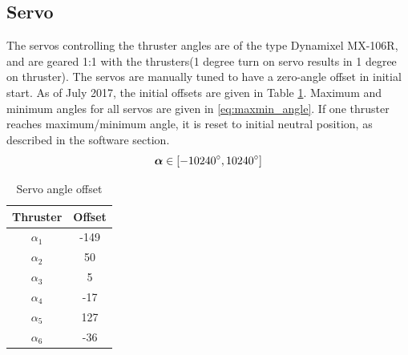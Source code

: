 \subsection{Servo}
The servos controlling the thruster angles are of the type Dynamixel MX-106R, and are geared 1:1 with the thrusters(1 degree turn on servo results in 1 degree on thruster). The servos are manually tuned to have a zero-angle offset in initial start. As of July 2017, the initial offsets are given in Table \ref{tab:angle_offset}. Maximum and minimum angles for all servos are given in \eqref{eq:maxmin_angle}. If one thruster reaches maximum/minimum angle, it is reset to initial neutral position, as described in the software section. 
\begin{equation}\label{eq:maxmin_angle}
	\bm{\alpha} \in [-10240\degree, 10240\degree]
\end{equation}
\begin{table}[htb!]
	\centering
	\caption{Servo angle offset}
	\begin{tabular}{cc}
		\hline
		\textbf{Thruster} & \textbf{Offset}\\ \hline
		$\alpha_1$ & -149\degree\\
		$\alpha_2$ & 50\degree\\
		$\alpha_3$ & 5\degree\\
		$\alpha_4$ & -17\degree\\
		$\alpha_5$ & 127\degree\\
		$\alpha_6$ & -36\degree\\
		\hline
	\end{tabular}
\label{tab:angle_offset}
\end{table}


